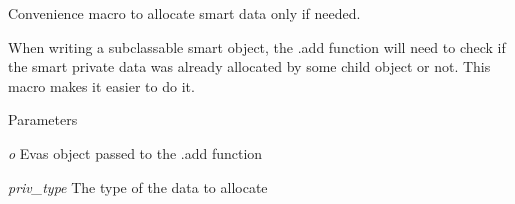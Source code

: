Convenience macro to allocate smart data only if needed. 

When writing a subclassable smart object, the .add function will need to check if the smart private data was already allocated by some child object or not. This macro makes it easier to do it.


\begin{DoxyParams}{Parameters}
\item[{\em o}]Evas object passed to the .add function \item[{\em priv\_\-type}]The type of the data to allocate \end{DoxyParams}
